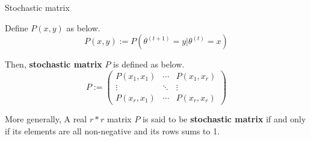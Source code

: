 \begin{frame}{Stochastic matrix}
    \begin{definition}
        Define $P(x,y)$ as below.
        \[P(x,y):= P(\theta^{(t+1)} =y  |\theta^{(t)} = x)\]
        
        Then, \textbf{stochastic matrix} $P$ is defined as below.
        \[
        P := 
        \begin{pmatrix}
            P(x_1,x_1) & \cdots & P(x_1,x_r) 
            \\\vdots & \ddots &\vdots        
            \\P(x_r,x_1) & \cdots & P(x_r,x_r)
        \end{pmatrix}
        \]
        
        More generally, A real $r*r$ matrix $P$ is said to be \textbf{stochastic matrix} if and only if its elements are all non-negative and its rows sums to 1.
    \end{definition}
\end{frame}


